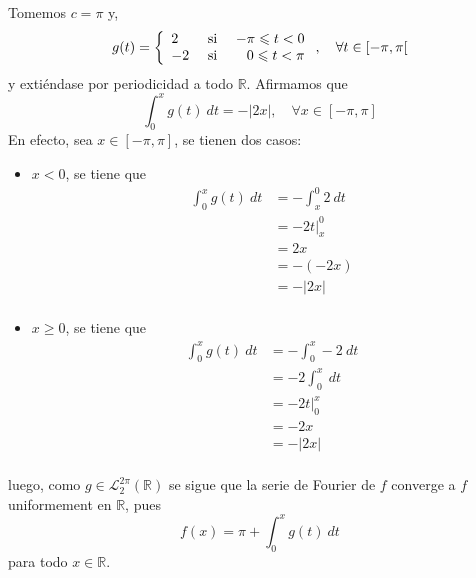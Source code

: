 \documentclass[12pt]{report}
\theoremstyle{largebreak}
\renewcommand{\leq}{\ensuremath{\leqslant}}
\renewcommand{\geq}{\ensuremath{\geqslant}}
\newcommand\abs[1]{\ensuremath{\left|#1\right|}}
\begin{document}
\begin{sol}
        Tomemos $c=\pi$ y,
        \begin{equation*}
            g(t)=\left\{
                \begin{array}{lcr}
                     2 & \textup{ si } & -\pi\leq t<0\\
                     -2 & \textup{ si } & 0\leq t<\pi\\
                \end{array}
            \right.,\quad\forall t\in[-\pi,\pi[
        \end{equation*}
        y extiéndase por periodicidad a todo $\mathbb{R}$. Afirmamos que
        \begin{equation*}
            \int_{0}^{x}g(t)\:dt = -\abs{2x},\quad\forall x\in[-\pi,\pi]
        \end{equation*}
        En efecto, sea $x\in[-\pi,\pi]$, se tienen dos casos:
        \begin{itemize}
            \item $x<0$, se tiene que 
            \begin{equation*}
                \begin{split}
                    \int_{0}^{x}g(t)\:dt&=-\int_{x}^{0}2\:dt\\
                    &=-2 t\Big|_{x}^0\\
                    &=2x\\
                    &=-(-2x)\\
                    &=-\abs{2x}\\
                \end{split}
            \end{equation*}
            \item $x\geq 0$, se tiene que
            \begin{equation*}
                \begin{split}
                    \int_{0}^{x}g(t)\:dt&=-\int_0^x -2\:dt\\
                    &=-2\int_0^x\:dt\\
                    &=-2t\Big|_{0}^x\\
                    &=-2x\\
                    &=-\abs{2x}\\
                \end{split}
            \end{equation*}
        \end{itemize}
        luego, como $g\in\mathcal{L}_2^{2\pi}(\mathbb{R})$ se sigue que la serie de Fourier de $f$ converge a $f$ uniformement en $\mathbb{R}$, pues
        \begin{equation*}
            f(x)=\pi+\int_{0}^{x}g(t)\:dt
        \end{equation*}
        para todo $x\in\mathbb{R}$.


\end{sol}
\end{document}
